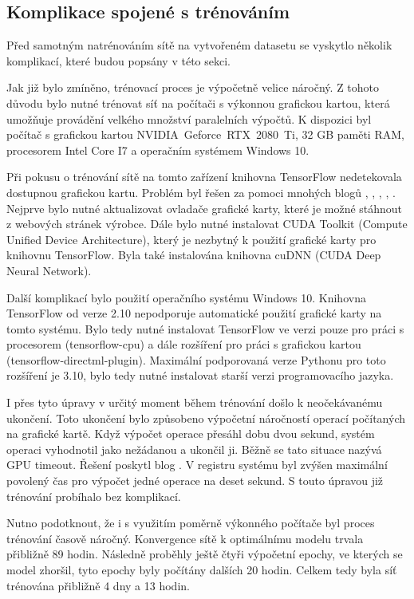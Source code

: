 \subsection{Komplikace spojené s trénováním}
\label{chap:pract:tr}
Před samotným natrénováním sítě na vytvořeném datasetu se vyskytlo několik komplikací, které budou popsány v této sekci.

Jak již bylo zmíněno, trénovací proces je výpočetně velice náročný. Z tohoto důvodu bylo nutné trénovat síť na počítači s výkonnou grafickou kartou, která umožňuje provádění velkého množství paralelních výpočtů. K dispozici byl počítač s grafickou kartou NVIDIA~Geforce~RTX~2080~Ti, 32 GB paměti RAM, procesorem Intel Core I7 a operačním systémem Windows 10. 

Při pokusu o trénování sítě na tomto zařízení knihovna TensorFlow nedetekovala dostupnou grafickou kartu. Problém byl řešen za pomoci mnohých blogů \cite{sc1}, \cite{sc2}, \cite{tfgpu1}, \cite{tfgpu2}, \cite{tfdir}. Nejprve bylo nutné aktualizovat ovladače grafické karty, které je možné stáhnout z webových stránek výrobce. Dále bylo nutné instalovat CUDA Toolkit (Compute Unified Device Architecture), který je nezbytný k použití grafické karty pro knihovnu TensorFlow. Byla také instalována knihovna cuDNN (CUDA Deep Neural Network).

Další komplikací bylo použití operačního systému Windows 10. Knihovna TensorFlow od verze 2.10 nepodporuje automatické použití grafické karty na tomto systému. Bylo tedy nutné instalovat TensorFlow ve verzi pouze pro práci s procesorem (tensorflow-cpu) a dále rozšíření pro práci s grafickou kartou (tensorflow-directml-plugin). Maximální podporovaná verze Pythonu pro toto rozšíření je 3.10, bylo tedy nutné instalovat starší verzi programovacího jazyka.

I přes tyto úpravy v určitý moment během trénování došlo k neočekávanému ukončení. Toto ukončení bylo způsobeno výpočetní náročností operací počítaných na grafické kartě. Když výpočet operace přesáhl dobu dvou sekund, systém operaci vyhodnotil jako nežádanou a ukončil ji. Běžně se tato situace nazývá GPU timeout. Řešení poskytl blog \cite{tfdir}. V registru systému byl zvýšen maximální povolený čas pro výpočet jedné operace na deset sekund. S touto úpravou již trénování probíhalo bez komplikací.

Nutno podotknout, že i s využitím poměrně výkonného počítače byl proces trénování časově náročný. Konvergence sítě k optimálnímu modelu trvala přibližně 89 hodin. Následně proběhly ještě čtyři výpočetní epochy, ve kterých se model zhoršil, tyto epochy byly počítány dalších 20 hodin. Celkem tedy byla síť trénována přibližně 4 dny a 13 hodin.

